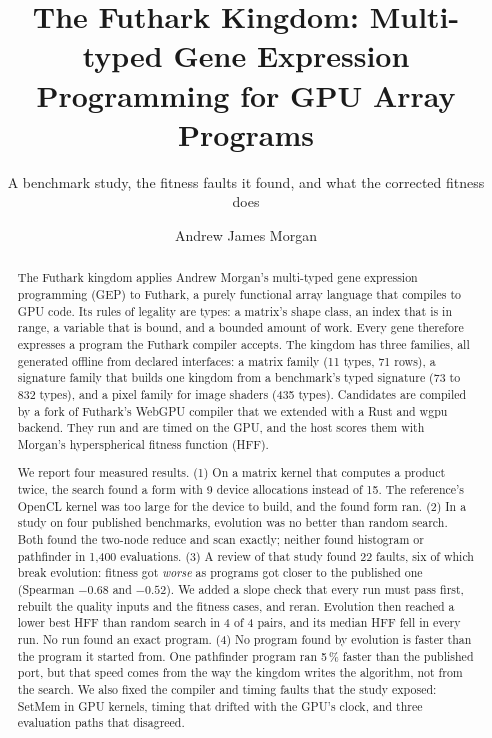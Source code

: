 \documentclass[sigconf,nonacm]{acmart}
\begin{document}
\title{The Futhark Kingdom: Multi-typed Gene Expression Programming for GPU Array Programs}
\subtitle{A benchmark study, the fitness faults it found, and what the corrected fitness does}

\author{Andrew James Morgan}

\begin{abstract}
The Futhark kingdom applies Andrew Morgan's multi-typed gene expression
programming (GEP) to Futhark, a purely functional array language that compiles
to GPU code. Its rules of legality are types: a matrix's shape class, an index
that is in range, a variable that is bound, and a bounded amount of work. Every
gene therefore expresses a program the Futhark compiler accepts. The kingdom has
three families, all generated offline from declared interfaces: a matrix
family (11 types, 71 rows), a signature family that builds one kingdom from a
benchmark's typed signature (73 to 832 types), and a pixel family for image
shaders (435 types). Candidates are compiled by a fork of Futhark's WebGPU
compiler that we extended with a Rust and wgpu backend. They run and are timed
on the GPU, and the host scores them with Morgan's hyperspherical fitness
function (HFF).

We report four measured results. (1) On a matrix kernel that computes a product
twice, the search found a form with 9 device allocations instead of 15. The
reference's OpenCL kernel was too large for the device to build, and the found
form ran. (2) In a study on four published benchmarks, evolution was no better
than random search. Both found the two-node reduce and scan exactly; neither
found histogram or pathfinder in 1,400 evaluations. (3) A review of that study
found 22 faults, six of which break evolution: fitness got \emph{worse} as
programs got closer to the published one (Spearman $-0.68$ and $-0.52$). We added
a slope check that every run must pass first, rebuilt the quality inputs and
the fitness cases, and reran. Evolution then reached a lower best HFF than
random search in 4 of 4 pairs, and its median HFF fell in every run. No run
found an exact program. (4) No program found by evolution is faster than the
program it started from. One pathfinder program ran 5\,\% faster than the
published port, but that speed comes from the way the kingdom writes the
algorithm, not from the search. We also fixed the compiler and timing faults
that the study exposed: SetMem in GPU kernels, timing that drifted with the
GPU's clock, and three evaluation paths that disagreed.
\end{abstract}
\end{document}
